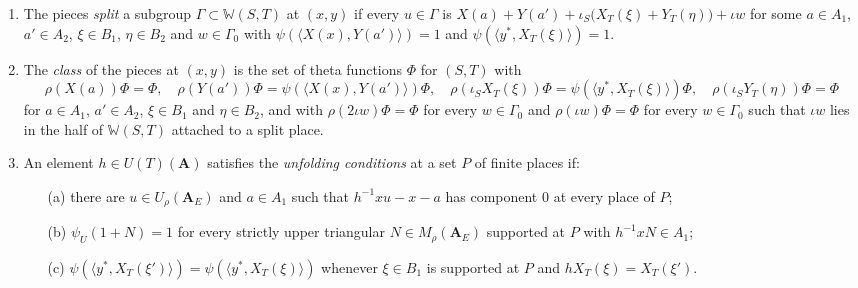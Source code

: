 \begin{definition}
\begin{enumerate}
\item The pieces \emph{split} a subgroup $\Gamma\subset\mathbb W(S,T)$ at $(x,y)$
  if every $u\in\Gamma$ is
  $X(a)+Y(a')+\iota_S\bigl(X_T(\xi)+Y_T(\eta)\bigr)+\iota w$ for some $a\in A_1$,
  $a'\in A_2$, $\xi\in B_1$, $\eta\in B_2$ and $w\in\Gamma_0$ with
  $\psi(\langle X(x),Y(a')\rangle)=1$ and $\psi(\langle y^*,X_T(\xi)\rangle)=1$.
\item The \emph{class} of the pieces at $(x,y)$ is the set of theta functions
  $\Phi$ for $(S,T)$ with
  \[
  \rho(X(a))\Phi=\Phi,\quad
  \rho(Y(a'))\Phi=\psi(\langle X(x),Y(a')\rangle)\Phi,\quad
  \rho(\iota_SX_T(\xi))\Phi=\psi(\langle y^*,X_T(\xi)\rangle)\Phi,\quad
  \rho(\iota_SY_T(\eta))\Phi=\Phi
  \]
  for $a\in A_1$, $a'\in A_2$, $\xi\in B_1$ and $\eta\in B_2$, and with
  $\rho(2\iota w)\Phi=\Phi$ for every $w\in\Gamma_0$ and $\rho(\iota w)\Phi=\Phi$
  for every $w\in\Gamma_0$ such that $\iota w$ lies in the half of
  $\mathbb W(S,T)$ attached to a split place.
\item An element $h\in U(T)(\mathbf A)$ satisfies the \emph{unfolding conditions}
  at a set $P$ of finite places if:
  \begin{enumerate}
  \item[(a)] there are $u\in U_\rho(\mathbf A_E)$ and $a\in A_1$ such that
    $h^{-1}xu-x-a$ has component $0$ at every place of $P$;
  \item[(b)] $\psi_U(1+N)=1$ for every strictly upper triangular
    $N\in M_\rho(\mathbf A_E)$ supported at $P$ with $h^{-1}xN\in A_1$;
  \item[(c)] $\psi(\langle y^*,X_T(\xi')\rangle)=\psi(\langle y^*,X_T(\xi)\rangle)$
    whenever $\xi\in B_1$ is supported at $P$ and $hX_T(\xi)=X_T(\xi')$.
  \end{enumerate}
\end{enumerate}
\end{definition}

